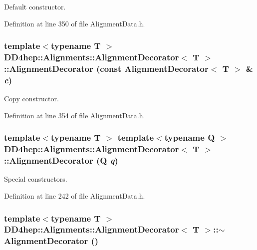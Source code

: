 Default constructor. 

Definition at line 350 of file AlignmentData.h.\hypertarget{class_d_d4hep_1_1_alignments_1_1_alignment_decorator_ae0098f576f3cfd3f2356a2fef9af3245}{
\subsubsection[{AlignmentDecorator}]{\setlength{\rightskip}{0pt plus 5cm}template$<$typename T $>$ {\bf DD4hep::Alignments::AlignmentDecorator}$<$ {\bf T} $>$::{\bf AlignmentDecorator} (const {\bf AlignmentDecorator}$<$ {\bf T} $>$ \& {\em c})}}
\label{class_d_d4hep_1_1_alignments_1_1_alignment_decorator_ae0098f576f3cfd3f2356a2fef9af3245}


Copy constructor. 

Definition at line 354 of file AlignmentData.h.\hypertarget{class_d_d4hep_1_1_alignments_1_1_alignment_decorator_ac557ab3bb22173fc50446f45eb9895a7}{
\subsubsection[{AlignmentDecorator}]{\setlength{\rightskip}{0pt plus 5cm}template$<$typename T $>$ template$<$typename Q $>$ {\bf DD4hep::Alignments::AlignmentDecorator}$<$ {\bf T} $>$::{\bf AlignmentDecorator} (Q {\em q})}}
\label{class_d_d4hep_1_1_alignments_1_1_alignment_decorator_ac557ab3bb22173fc50446f45eb9895a7}


Special constructors. 

Definition at line 242 of file AlignmentData.h.\hypertarget{class_d_d4hep_1_1_alignments_1_1_alignment_decorator_a4073c296e3287d0cbdb102b4d0f9f7ba}{
\subsubsection[{$\sim$AlignmentDecorator}]{\setlength{\rightskip}{0pt plus 5cm}template$<$typename T $>$ {\bf DD4hep::Alignments::AlignmentDecorator}$<$ {\bf T} $>$::$\sim${\bf AlignmentDecorator} ()}}
\label{class_d_d4hep_1_1_alignments_1_1_alignment_decorator_a4073c296e3287d0cbdb102b4d0f9f7ba}


